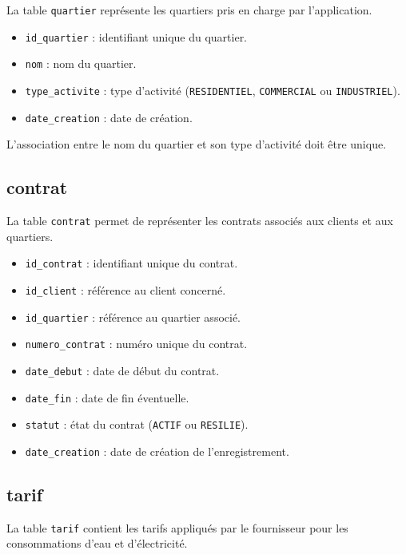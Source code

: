 La table \texttt{quartier} représente les quartiers pris en charge par l'application.

\begin{itemize}[leftmargin=*]
    \item \texttt{id\_quartier} : identifiant unique du quartier.
    \item \texttt{nom} : nom du quartier.
    \item \texttt{type\_activite} : type d'activité (\texttt{RESIDENTIEL}, \texttt{COMMERCIAL} ou \texttt{INDUSTRIEL}).
    \item \texttt{date\_creation} : date de création.
\end{itemize}

L'association entre le nom du quartier et son type d'activité doit être unique.

\subsection{contrat}

La table \texttt{contrat} permet de représenter les contrats associés aux clients et aux quartiers.

\begin{itemize}[leftmargin=*]
    \item \texttt{id\_contrat} : identifiant unique du contrat.
    \item \texttt{id\_client} : référence au client concerné.
    \item \texttt{id\_quartier} : référence au quartier associé.
    \item \texttt{numero\_contrat} : numéro unique du contrat.
    \item \texttt{date\_debut} : date de début du contrat.
    \item \texttt{date\_fin} : date de fin éventuelle.
    \item \texttt{statut} : état du contrat (\texttt{ACTIF} ou \texttt{RESILIE}).
    \item \texttt{date\_creation} : date de création de l'enregistrement.
\end{itemize}

\subsection{tarif}

La table \texttt{tarif} contient les tarifs appliqués par le fournisseur pour les consommations d'eau et d'électricité.

